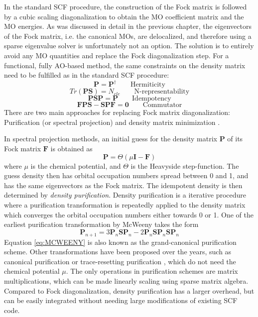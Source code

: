 In the standard SCF procedure, the construction of the Fock matrix is followed by a cubic scaling diagonalization to obtain the MO coefficient matrix and the MO energies. As was discussed in detail in the previous chapter, the eigenvectors of the Fock matrix, i.e. the canonical MOs, are delocalized, and therefore using a sparse eigenvalue solver is unfortunately not an option. The solution is to entirely avoid any MO quantities and replace the Fock diagonalization step. For a functional, fully AO-based method, the same constraints on the density matrix need to be fulfilled as in the standard SCF procedure:
\begin{equation}
\mathbf{P} = \mathbf{P}^{\dagger} \qquad \textrm{Hermiticity}
\end{equation}
\begin{equation}
Tr(\mathbf{PS}) = N_{ele} \qquad \textrm{N-representability}
\end{equation}
\begin{equation}
\mathbf{PSP} = \mathbf{P} \qquad \textrm{Idempotency}
\end{equation}
\begin{equation}
\mathbf{FPS} - \mathbf{SPF} = \mathbf{0} \qquad \textrm{Commutator}
\end{equation}
\noindent There are two main approaches for replacing Fock matrix diagonalization: Purification (or spectral projection) and density matrix minimization \cite{Kim2016}. %

In spectral projection methods, an initial guess for the density matrix $\mathbf{P}$ of its Fock matrix $\mathbf{F}$ is obtained as
\begin{equation}
\mathbf{P} = \Theta \left( \mu \mathbf{I} - \mathbf{F} \right)
\end{equation}
\noindent where $\mu$ is the chemical potential, and $\Theta$ is the Heavyside step-function. The guess density then has orbital occupation numbers spread between 0 and 1, and has the same eigenvectors as the Fock matrix. The idempotent density is then determined by \emph{density purification}. Density purification is a iterative procedure where a purification transformation is repeatedly applied to the density matrix which converges the orbital occupation numbers either towards 0 or 1. One of the earliest purification transformation by McWeeny \cite{McW1959} takes the form
\begin{equation}
\mathbf{P}_{n+1} = 3\mathbf{P}_n\mathbf{SP}_n - 2\mathbf{P}_n\mathbf{SP}_n\mathbf{SP}_n
\label{eq:MCWEENY}
\end{equation}
\noindent Equation \ref{eq:MCWEENY} is also known as the grand-canonical purification scheme. Other transformations have been proposed over the years, such as canonical purification \cite{Pal1998} or trace-resetting purification \cite{Nik2003}, which do not need the chemical potential $\mu$. The only operations in purification schemes are matrix multiplications, which can be made linearly scaling using sparse matrix algebra. Compared to Fock diagonalization, density purification has a larger overhead, but can be easily integrated without needing large modifications of existing SCF code.

